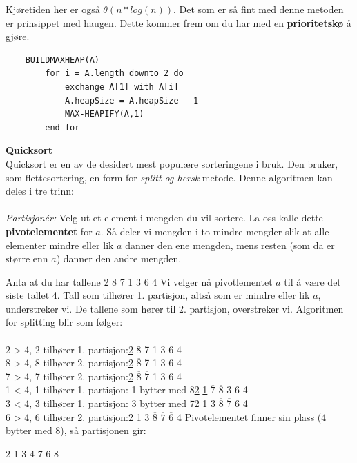 \noindent Kjøretiden her er også \textbf{$\theta(n * log(n))$}. Det som er så fint med denne metoden er prinsippet med haugen. Dette kommer frem om du har med en \textbf{prioritetskø} å gjøre.

\begin{lstlisting}
    BUILDMAXHEAP(A)
        for i = A.length downto 2 do
	        exchange A[1] with A[i]
	        A.heapSize = A.heapSize - 1
	        MAX-HEAPIFY(A,1)
        end for
\end{lstlisting}

\noindent \textbf{Quicksort}\\
Quicksort er en av de desidert mest populære sorteringene i bruk. Den bruker, som flettesortering, en form for \textit{splitt og hersk}-metode. Denne algoritmen kan deles i tre trinn:
\\\\
\textit{Partisjonér:} Velg ut et element i mengden du vil sortere. La oss kalle dette \textbf{pivotelementet} for $a$. Så deler vi mengden i to mindre mengder slik at alle elementer mindre eller lik $a$ danner den ene mengden, mens resten (som da er større enn $a$) danner den andre mengden.

\begin{boxed}
Anta at du har tallene 2 8 7 1 3 6 4
\newline \newline
Vi velger nå pivotlementet $a$ til å være det siste tallet 4. Tall som tilhører 1. partisjon, altså som er mindre eller lik $a$, understreker vi. De tallene som hører til 2. partisjon, overstreker vi. Algoritmen for splitting blir som følger:
\\\\
2 > 4, 2 tilhører 1. partisjon:\hfill \underline{2} 8 7 1 3 6 4\\

8 > 4, 8 tilhører 2. partisjon:\hfill \underline{2} $\overline{8}$ 7 1 3 6 4\\

7 > 4, 7 tilhører 2. partisjon:\hfill \underline{2} $\overline{8}$ $\overline{7}$ 1 3 6 4\\

1 < 4, 1 tilhører 1. partisjon:  1 bytter med 8\hfill \underline{2} \underline{1} $\overline{7}$ $\overline{8}$ 3 6 4\\

3 < 4, 3 tilhører 1. partisjon: 3 bytter med 7\hfill \underline{2} \underline{1} \underline{3} $\overline{8}$ $\overline{7}$ 6 4\\

6 > 4, 6 tilhører 2. partisjon:\hfill \underline{2} \underline{1} \underline{3} $\overline{8}$ $\overline{7}$ $\overline{6}$ 4
\newline\newline
Pivotelementet finner sin plass (4 bytter med 8), så partisjonen gir:
\begin{center}
2 1 3 4 7 6 8
\end{center}
\end{boxed}

